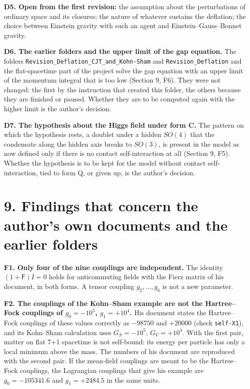 \documentclass[
  10pt,
]{article}
\begin{document}
\textbf{D5. Open from the first revision:} the assumption about the
perturbations of ordinary space and its closures; the nature of whatever
sustains the deflation; the choice between Einstein gravity with such an
agent and Einstein--Gauss--Bonnet gravity.

\textbf{D6. The earlier folders and the upper limit of the gap
equation.} The folders \texttt{Revision\_Deflation\_CJT\_and\_Kohn-Sham}
and \texttt{Revision\_Deflation} and the flat-spacetime part of the
project solve the gap equation with an upper limit of the momentum
integral that is too low (Section 9, F6). They were not changed: the
first by the instruction that created this folder, the others because
they are finished or paused. Whether they are to be computed again with
the higher limit is the author's decision.

\textbf{D7. The hypothesis about the Higgs field under form C.} The
pattern on which the hypothesis rests, a doublet under a hidden
\(SO(4)\) that the condensate along the hidden axis breaks to \(SO(3)\),
is present in the model as now defined only if there is no contact
self-interaction at all (Section 9, F5). Whether the hypothesis is to be
kept for the model without contact self-interaction, tied to form Q, or
given up, is the author's decision.

\hypertarget{findings-that-concern-the-authors-own-documents-and-the-earlier-folders}{%
\section{9. Findings that concern the author's own documents and the
earlier
folders}\label{findings-that-concern-the-authors-own-documents-and-the-earlier-folders}}

\textbf{F1. Only four of the nine couplings are independent.} The
identity \((1+\mathsf F)I=0\) holds for anticommuting fields with the
Fierz matrix of his document, in both forms. A tensor coupling
\(g_2,\dots,g_6\) is not a new parameter.

\textbf{F2. The couplings of the Kohn--Sham example are not the
Hartree--Fock couplings of \(g_0=-10^5\), \(g_1=+10^4\).} His document
states the Hartree--Fock couplings of these values correctly as
\(-98750\) and \(+20000\) (check \texttt{self-X1}), and its Kohn--Sham
calculation uses \(G_S=-10^5\), \(G_V=+10^4\). With the first pair,
matter on flat 7+1 spacetime is not self-bound: its energy per particle
has only a local minimum above the mass. The numbers of his document are
reproduced with the second pair. If the mean-field couplings are meant
to be the Hartree--Fock couplings, the Lagrangian couplings that give
his example are \(g_0=-105341.6\) and \(g_1=+2484.5\) in the same units.
\end{document}
